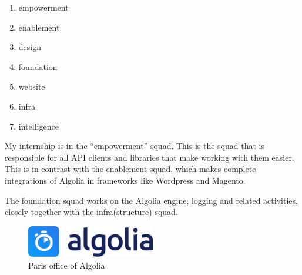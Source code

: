 \begin{enumerate}
  \item empowerment
  \item enablement
  \item design
  \item foundation
  \item website
  \item infra
  \item intelligence
\end{enumerate}

My internship is in the ``empowerment'' squad. This is the squad that is responsible for all API clients and libraries that make working with them easier. This is in contrast with the enablement squad, which makes complete integrations of Algolia in frameworks like Wordpress\cite{algolia-wordpress} and Magento\cite{algolia-magento}.

The foundation squad works on the Algolia engine, logging and related activities, closely together with the infra(structure) squad.

\begin{figure}[H]
  \label{figure:company-logo}
  \centering
  \includegraphics[width=0.5\textwidth]{../assets/algolia-logo-light.pdf}
  \caption{Paris office of Algolia}
\end{figure}
